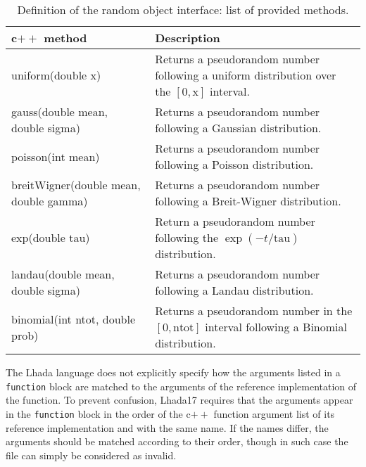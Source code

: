 \documentclass[11pt]{cernrep}
\begin{document}
 
\begin{table}
  \caption{Definition of the random object interface: list of provided methods. \label{tab:rand}}
  \begin{tabular}{l|p{20em}}
    c$++$ method & Description \\
    \hline
    uniform(double x)  & Returns a pseudorandom number following a uniform distribution over the $[0, \text{x}]$ interval.\\
    gauss(double mean, double sigma)    & Returns a pseudorandom number following a Gaussian distribution.\\
    poisson(int mean) & Returns a pseudorandom number following a Poisson distribution.\\
    breitWigner(double mean, double gamma) & Returns a pseudorandom number following a Breit-Wigner distribution. \\
    exp(double tau) & Return a pseudorandom number following the $\exp(-t/\text{tau})$ distribution. \\
    landau(double mean, double sigma) & Returns a pseudorandom number following a Landau distribution. \\
    binomial(int ntot, double prob) & Returns a pseudorandom number in the $[0, \text{ntot}]$ interval following a Binomial distribution.
  \end{tabular}
\end{table}


The {\sc Lhada} language does not explicitly specify how the arguments listed in a {\tt function} block are matched to the arguments of the reference implementation of the function. To prevent confusion, {\sc Lhada17} requires that the arguments appear in the {\tt function} block in the order of the c$++$ function argument list of its reference implementation and with the same name. If the names differ, the arguments should be matched according to their order, though in such case the file can simply be considered as invalid.
\end{document}
